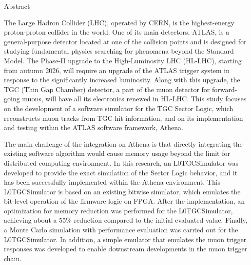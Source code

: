 \begin{abstractpage}{Abstract}



    The Large Hadron Collider (LHC), operated by CERN, is the highest-energy proton-proton collider in the world. One of its main detectors, ATLAS, is a general-purpose detector located at one of the collision points and is designed for studying fundamental physics searching for phenomena beyond the Standard Model. The Phase-II upgrade to the High-Luminosity LHC (HL-LHC), starting from autumn 2026, will require an upgrade of the ATLAS trigger system in response to the significantly increased luminosity. Along with this upgrade, the TGC (Thin Gap Chamber) detector, a part of the muon detector for forward-going muons, will have all its electronics renewed in HL-LHC. This study focuses on the development of a software simulator for the TGC Sector Logic, which reconstructs muon tracks from TGC hit information, and on its implementation and testing within the ATLAS software framework, Athena.

    The main challenge of the integration on Athena is that directly integrating the existing software algorithm would cause memory usage beyond the limit for distributed computing environment. In this research, an L0TGCSimulator was developed to provide the exact simulation of the Sector Logic behavior, and it has been successfully implemented within the Athena environment. This L0TGCSimulator is based on an existing bitwise simulator, which emulates the bit-level operation of the firmware logic on FPGA. After the implementation, an optimization for memory reduction was performed for the L0TGCSimulator, achieving about a 55\% reduction compared to the initial evaluated value. Finally, a Monte Carlo simulation with performance evaluation was carried out for the L0TGCSimulator. In addition, a simple emulator that emulates the muon trigger responses was developed to enable downstream developments in the muon trigger chain.

\end{abstractpage}
